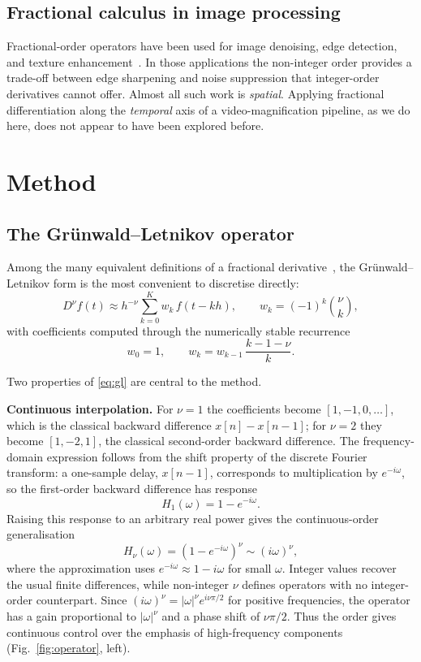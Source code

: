 \documentclass[conference]{IEEEtran}
\begin{document}
\subsection{Fractional calculus in image processing}
Fractional-order operators have been used for image denoising, edge detection,
and texture enhancement~\cite{pu2010,yang2016}. In those applications the
non-integer order provides a trade-off between edge sharpening and noise
suppression that integer-order derivatives cannot offer. Almost all such work
is \emph{spatial}. Applying fractional differentiation along the
\emph{temporal} axis of a video-magnification pipeline, as we do here, does
not appear to have been explored before.

\section{Method}

\subsection{The Gr\"unwald--Letnikov operator}

Among the many equivalent definitions of a fractional
derivative~\cite{podlubny1999}, the Gr\"unwald--Letnikov form is the most
convenient to discretise directly:
\begin{equation}
D^{\nu} f(t) \approx h^{-\nu} \sum_{k=0}^{K} w_k \, f(t - kh),
\qquad w_k = (-1)^k \binom{\nu}{k},
\label{eq:gl}
\end{equation}
with coefficients computed through the numerically stable recurrence
\begin{equation}
w_0 = 1, \qquad w_k = w_{k-1}\,\frac{k-1-\nu}{k}.
\label{eq:recurrence}
\end{equation}

Two properties of \eqref{eq:gl} are central to the method.

\textbf{Continuous interpolation.} For $\nu = 1$ the coefficients become
$[1,-1,0,\dots]$, which is the classical backward difference
$x[n]-x[n-1]$; for $\nu = 2$ they become $[1,-2,1]$, the classical
second-order backward difference. The frequency-domain expression follows from
the shift property of the discrete Fourier transform: a one-sample delay,
$x[n-1]$, corresponds to multiplication by $e^{-i\omega}$, so the first-order
backward difference has response
\[
H_1(\omega)=1-e^{-i\omega}.
\]
Raising this response to an arbitrary real power gives the continuous-order
generalisation
\begin{equation}
H_{\nu}(\omega) = \left(1 - e^{-i\omega}\right)^{\nu}
\sim (i\omega)^{\nu},
\label{eq:response}
\end{equation}
where the approximation uses $e^{-i\omega}\approx 1-i\omega$ for small
$\omega$. Integer values recover the usual finite differences, while
non-integer $\nu$ defines operators with no integer-order counterpart. Since
$(i\omega)^\nu = |\omega|^\nu e^{i\nu\pi/2}$ for positive frequencies, the
operator has a gain proportional to $|\omega|^\nu$ and a phase shift of
$\nu\pi/2$. Thus the order gives continuous control over the emphasis of
high-frequency components (Fig.~\ref{fig:operator}, left).
\end{document}

